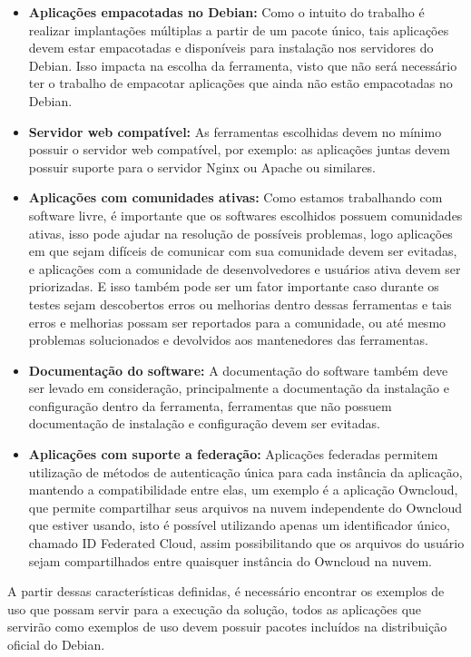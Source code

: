 \begin{itemize}
  \item  \textbf{Aplicações empacotadas no Debian:} Como o intuito do trabalho
  é realizar implantações múltiplas a partir de um pacote único, tais aplicações
  devem estar empacotadas e disponíveis para instalação nos servidores do Debian.
  Isso impacta na escolha da ferramenta, visto que não será necessário ter o trabalho
  de empacotar aplicações que ainda não estão empacotadas no Debian.
  \item  \textbf{Servidor web compatível:} As ferramentas escolhidas devem no
  mínimo possuir o servidor web compatível, por exemplo: as aplicações juntas
  devem possuir suporte para o servidor Nginx ou Apache ou similares.
  \item  \textbf{Aplicações com comunidades ativas:} Como estamos trabalhando
  com software livre, é importante que os softwares escolhidos possuem comunidades
  ativas, isso pode ajudar na resolução de possíveis problemas, logo aplicações
  em que sejam difíceis de comunicar com sua comunidade devem ser evitadas, e
  aplicações com a comunidade de desenvolvedores e usuários ativa devem ser priorizadas.
  E isso também pode ser um fator importante caso durante os testes sejam descobertos
  erros ou melhorias dentro dessas ferramentas e tais erros e melhorias possam ser
  reportados para a comunidade, ou até mesmo problemas solucionados e devolvidos aos mantenedores
  das ferramentas.
  \item  \textbf{Documentação do software:} A documentação do software também deve
  ser levado em consideração, principalmente a documentação da instalação e configuração
  dentro da ferramenta, ferramentas que não possuem documentação de instalação e
  configuração devem ser evitadas.
  \item  \textbf{Aplicações com suporte a federação:} Aplicações federadas permitem
 utilização de métodos de autenticação única para cada instância da aplicação, 
mantendo a compatibilidade entre elas, um exemplo é a aplicação Owncloud, 
que permite compartilhar seus arquivos na nuvem independente do Owncloud que estiver usando, 
isto é possível utilizando apenas um identificador único, chamado ID Federated Cloud, assim
possibilitando que os arquivos do usuário sejam compartilhados entre quaisquer instância do
Owncloud na nuvem.
\end{itemize}

A partir dessas características definidas, é necessário encontrar os exemplos de uso
que possam servir para a execução da solução, todos as aplicações que servirão como
exemplos de uso devem possuir pacotes incluídos na distribuição oficial do Debian.

